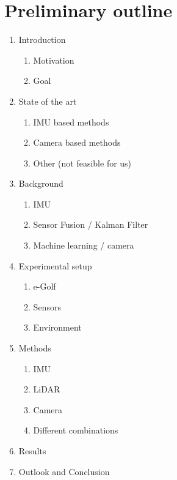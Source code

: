 \documentclass{paper}
\begin{document}
\section{Preliminary outline}
\begin{enumerate}
    \item Introduction
        \begin{enumerate}
            \item Motivation
            \item Goal
        \end{enumerate}
    \item State of the art
        \begin{enumerate}
            \item IMU based methods
            \item Camera based methods
            \item Other (not feasible for us)
        \end{enumerate}
    \item Background
    \begin{enumerate}
        \item IMU
        \item Sensor Fusion / Kalman Filter
        \item Machine learning / camera
    \end{enumerate}
    \item Experimental setup
        \begin{enumerate}
            \item e-Golf
            \item Sensors
            \item Environment
        \end{enumerate}
    \item Methods
    \begin{enumerate}
        \item IMU
        \item LiDAR
        \item Camera
        \item Different combinations
    \end{enumerate}
    \item Results
    \item Outlook and Conclusion
\end{enumerate}

\end{document}
